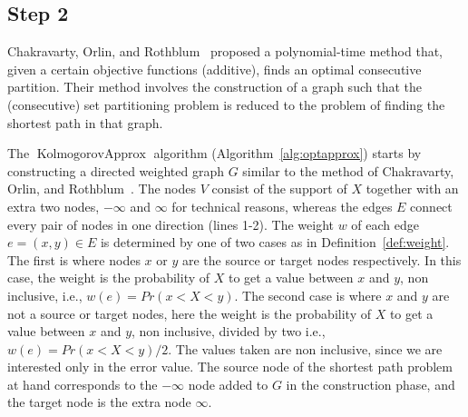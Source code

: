 \documentclass{article}
\DeclareMathOperator{\KlmApprox}{KolmogorovApprox}
\begin{document}
\subsection{Step 2}
Chakravarty, Orlin, and Rothblum~\cite{chakravarty1982partitioning} proposed a polynomial-time method that, given a certain objective functions (additive), finds an optimal consecutive partition. Their method involves the construction of a graph such that the (consecutive) set partitioning problem is reduced to the problem of finding the shortest path in that graph.

The $\KlmApprox$ algorithm (Algorithm~\ref{alg:optapprox}) starts by constructing a directed weighted graph $G$ similar to the method of Chakravarty, Orlin, and Rothblum~\cite{chakravarty1982partitioning}. The nodes $V$ consist of the support of $X$ together with an extra two nodes, $-\infty$ and $\infty$ for technical reasons, whereas the edges $E$ connect every pair of nodes in one direction (lines 1-2). The weight $w$ of each edge $e=(x,y)\in E$ is determined by one of two cases as in Definition~\ref{def:weight}. The first is where nodes $x$ or $y$ are the source or target nodes respectively. In this case, the weight is the probability of $X$ to get a value between $x$ and $y$, non inclusive, i.e., $w(e)=Pr(x<X<y)$. The second case is where $x$ and $y$ are not a source or target nodes, here the weight is the probability of $X$ to get a value between $x$ and $y$, non inclusive, divided by two i.e., $w(e)=Pr(x<X<y)/2$. The values taken are non inclusive, since we are interested only in the error value. 
The source node of the shortest path problem at hand corresponds to the $-\infty$ node added to $G$ in the construction phase, and the target node is the extra node $\infty$.
\end{document}
